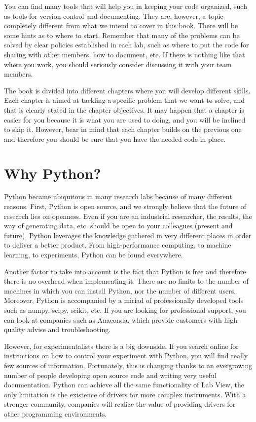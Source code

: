 You can find many tools that will help you in keeping your code organized, such as tools for version control and documenting. They are, however, a topic completely different from what we intend to cover in this book. There will be some hints as to where to start. Remember that many of the problems can be solved by clear policies established in each lab, such as where to put the code for sharing with other members, how to document, etc. If there is nothing like that where you work, you should seriously consider discussing it with your team members.

The book is divided into different chapters where you will develop different skills. Each chapter is aimed at tackling a specific problem that we want to solve, and that is clearly stated in the chapter objectives. It may happen that a chapter is easier for you because it is what you are used to doing, and you will be inclined to skip it. However, bear in mind that each chapter builds on the previous one and therefore you should be sure that you have the needed code in place.

\section{Why Python?}
Python became ubiquitous in many research labs because of many different reasons. First, Python is open source, and we strongly believe that the future of research lies on openness. Even if you are an industrial researcher, the results, the way of generating data, etc. should be open to your colleagues (present and future). Python leverages the knowledge gathered in very different places in order to deliver a better product. From high-performance computing, to machine learning, to experiments, Python can be found everywhere. 

Another factor to take into account is the fact that Python is free and therefore there is no overhead when implementing it. There are no limits to the number of machines in which you can install Python, nor the number of different users. Moreover, Python is accompanied by a miriad of professionally developed tools such as numpy, scipy, scikit, etc. If you are looking for professional support, you can look at companies such as Anaconda, which provide customers with high-quality advise and troubleshooting. 

However, for experimentalists there is a big downside. If you search online for instructions on how to control your experiment with Python, you will find really few sources of information. Fortunately, this is changing thanks to an evergrowing number of people developing open source code and writing very useful documentation. Python can achieve all the same functionality of Lab View, the only limitation is the existence of drivers for more complex instruments. With a stronger community, companies will realize the value of providing drivers for other programming environments.

